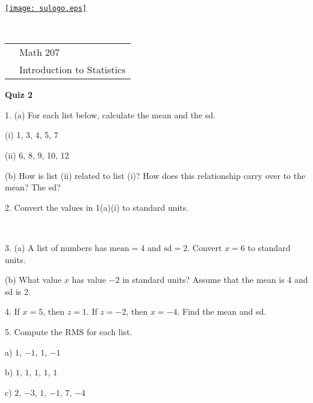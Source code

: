 \documentclass[10pt]{article}
\begin{document}
\pagestyle{empty}
\lstset{language=R, showspaces=false, showstringspaces=false}

\href{http://www.su.edu}{\texttt{[image: sulogo.eps]}}
\vspace{-1.69cm}

{{\ }\hfill\small
\begin{tabular}{cl}
& Math 207\\
& Introduction to Statistics\\
\end{tabular}
}
\setlength{\baselineskip}{1.05\baselineskip}
\bigskip

\begin{center}
\textbf{\large  Quiz 2}
\end{center}
\medskip


1. (a) For each list below, calculate the mean and the sd.

\hspace{20pt} (i) 1, 3, 4, 5, 7\vspace{1.8in}

\hspace{20pt} (ii) 6, 8, 9, 10, 12\vspace{1.8in}

\hphantom{1. } (b) How is list (ii) related to list (i)?  How does this
relationship carry over to the mean?  The sd?
\vspace{1.25in}

2. Convert the values in 1(a)(i) to standard units.

\vfill
\eject
{\ }

3. (a) A list of numbers has $\mbox{mean}=4$ and $\mbox{sd}=2$.
Convert $x=6$ to standard units.
\vspace{1.25in}

\hphantom{2. } (b) What  value $x$ has value $-2$ in standard units?  
Assume that the mean is 4 and sd is 2.
\vspace{1.5in}

4. If $x=5$, then $z=1$.  If $z=-2$, then $x=-4$.  Find the mean and sd.
\vspace{2.5in}

5. Compute the RMS for each list.

\hspace{10pt} a) $1$, $-1$, $1$, $-1$
\vspace{.8in}

\hspace{10pt} b) $1$, $1$, $1$, $1$, $1$
\vspace{.8in}

\hspace{10pt} c) $2$, $-3$, $1$, $-1$, $7$, $-4$
\vfill
\eject
\end{document}
